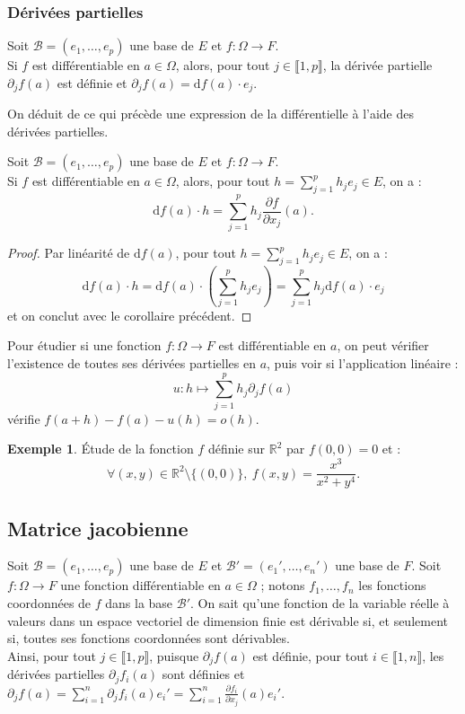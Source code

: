 \documentclass[french]{article}
\newcommand{\R}{\mathbb{R}}
\renewcommand{\d}{\text{d}}
\theoremstyle{plain}
\theoremstyle{definition}
\newtheorem*{ex}{Exemple}
\theoremstyle{remark}
\begin{document}
\subsubsection*{Dérivées partielles}

\begin{cor}%
	Soit $\mathcal{B}=(e_1,\ldots,e_p)$ une base de $E$ et $f:\Omega\to F$.\\
	Si $f$ est différentiable en $a\in\Omega$, alors, pour tout $j\in\llbracket1,p\rrbracket$, la dérivée partielle $\partial_jf(a)$ est définie et $\partial_jf(a)=\d f(a)\cdot e_j$.
\end{cor}

On déduit de ce qui précède une expression de la différentielle à l'aide des dérivées partielles.

\begin{cor}%
	Soit $\mathcal{B}=(e_1,\ldots,e_p)$ une base de $E$ et $f:\Omega\to F$.\\ Si $f$ est différentiable en $a\in\Omega$,  alors, pour tout $h=\displaystyle\sum_{j=1}^{p}h_je_j\in E$, on a :
	$$\d f(a)\cdot h=\sum_{j=1}^{p}h_j\frac{\partial f}{\partial x_j}(a).$$
\end{cor}
\begin{proof}
	Par linéarité de $\d f(a)$, pour tout $h=\displaystyle\sum_{j=1}^{p}h_je_j\in E$, on a :
	$$\d f(a)\cdot h=\d f(a)\cdot\left(\sum_{j=1}^{p}h_je_j\right)=\sum_{j=1}^{p}h_j\d f(a)\cdot e_j$$ et on conclut avec le corollaire précédent.
\end{proof}

\begin{met}
	Pour étudier si une fonction $f:\Omega\to F$ est différentiable en $a$, on peut vérifier l'existence de toutes ses dérivées partielles en $a$, puis voir si l'application linéaire : $$u:h\mapsto\sum_{j=1}^{p}h_j\partial_jf(a)$$ vérifie $f(a+h)-f(a)-u(h)=o(h)$.
\end{met}

\begin{ex}
	Étude de la fonction $f$ définie sur $\R^2$ par $f(0,0)=0$ et :
	$$\forall (x,y)\in\R^2\setminus\{(0,0)\},\ f(x,y)=\frac{x^3}{x^2+y^4}.$$
\end{ex}

\subsection{Matrice jacobienne}

Soit $\mathcal{B}=(e_1,\ldots,e_p)$ une base de $E$ et $\mathcal{B}'=(e_1',\ldots,e_n')$ une base de $F$. Soit $f:\Omega\to F$ une fonction différentiable en $a\in\Omega$ ; notons $f_1,\ldots,f_n$ les fonctions coordonnées de $f$ dans la base $\mathcal{B}'$. On sait qu'une fonction de la variable réelle à valeurs dans un espace vectoriel de dimension finie est dérivable si, et seulement si, toutes ses fonctions coordonnées sont dérivables.\\
Ainsi, pour tout $j\in\llbracket1,p\rrbracket$, puisque $\partial_jf(a)$ est définie, pour tout $i\in\llbracket1,n\rrbracket$, les dérivées partielles $\partial_jf_i(a)$ sont définies et $\partial_jf(a)=\displaystyle\sum_{i=1}^{n}\partial_jf_i(a)e_i'=\sum_{i=1}^{n}\frac{\partial f_i}{\partial x_j}(a)e_i'$.
\end{document}
